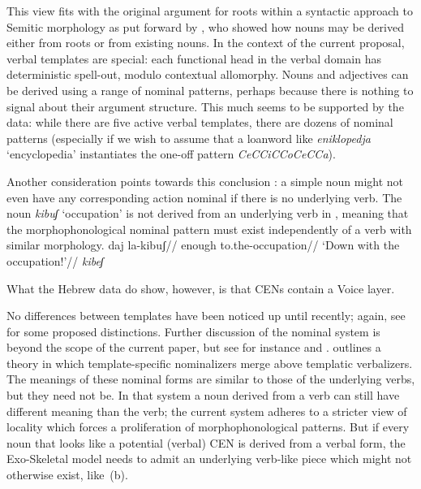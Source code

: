 This view fits with the original argument for roots within a syntactic approach to Semitic morphology as put forward by \cite{arad03}, who showed how nouns may be derived either from roots or from existing nouns. In the context of the current proposal, verbal templates are special: each functional head in the verbal domain has deterministic spell-out, modulo contextual allomorphy. Nouns and adjectives can be derived using a range of nominal patterns, perhaps because there is nothing to signal about their argument structure. This much seems to be supported by the data: while there are five active verbal templates, there are dozens of nominal patterns (especially if we wish to assume that a loanword like \emph{en{\ts}iklopedja} `encyclopedia' instantiates the one-off pattern \emph{CeCCiCCoCeCCa}).

Another consideration points towards this conclusion \citep{kastner18nllt}: a simple noun might not even have any corresponding action nominal if there is no underlying verb. The noun \emph{kibuʃ} `occupation' is not derived from an underlying verb in {\tpie}, meaning that the morphophonological nominal pattern  must exist independently of a verb with similar morphology.
\pex
	\a \begingl
		\gla daj la-kibuʃ//
		\glb enough to.the-occupation//
		\glft `Down with the occupation!'//
	\endgl	
	\a \ljudge{*} \emph{kibeʃ}
\xe

What the Hebrew data do show, however, is that CENs contain a Voice layer.

No differences between templates have been noticed up until recently; again, see \cite{ahdout19glow,ahdout19phd} for some proposed distinctions. Further discussion of the nominal system is beyond the scope of the current paper, but see for instance \cite{fausthever10} and \cite{laks15ws}. \citet[534ff13,555]{borer13oup} outlines a theory in which template-specific nominalizers merge above templatic verbalizers. The meanings of these nominal forms are similar to those of the underlying verbs, but they need not be. In that system a noun derived from a verb can still have different meaning than the verb; the current system adheres to a stricter view of locality which forces a proliferation of morphophonological patterns. But if every noun that looks like a potential (verbal) CEN is derived from a verbal form, the Exo-Skeletal model needs to admit an underlying verb-like piece which might not otherwise exist, like~(\lastx b).

%



